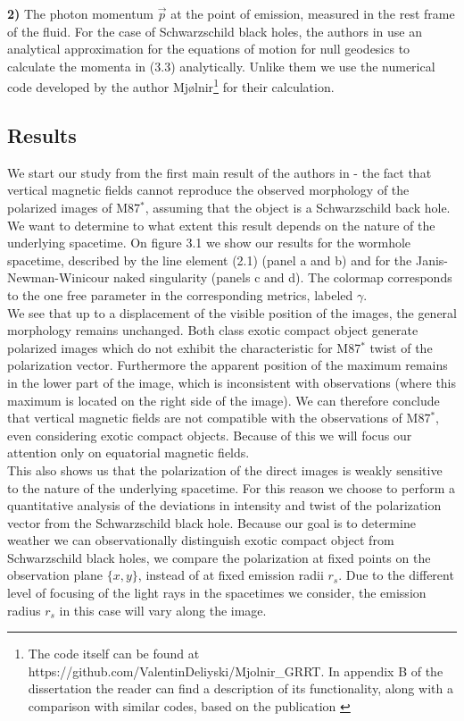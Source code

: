 \documentclass[12pt]{article}
\numberwithin{equation}{section}
\numberwithin{figure}{section}
\begin{document}
	\textbf{2)} The photon momentum $\vec{p}$ at the point of emission, measured in the rest frame of the fluid. For the case of Schwarzschild black holes, the authors in \cite{Narayan2021} use an analytical approximation for the equations of motion for null geodesics to calculate the momenta in (3.3) analytically. Unlike them we use the numerical code developed by the author Mjølnir\footnote{The code itself can be found at https://github.com/ValentinDeliyski/Mjolnir\_GRRT. In appendix B of the dissertation the reader can find a description of its functionality, along with a comparison with similar codes, based on the publication \cite{Gold2020}} for their calculation.
	\newpage
	\subsection{Results}
	
	We start our study from the first main result of the authors in \cite{Narayan2021} - the fact that vertical magnetic fields cannot reproduce the observed morphology of the polarized images of M87$^*$, assuming that the object is a Schwarzschild back hole. We want to determine to what extent this result depends on the nature of the underlying spacetime. On figure 3.1 we show our results for the wormhole spacetime, described by the line element (2.1) (panel a and b) and for the Janis-Newman-Winicour naked singularity (panels c and d). The colormap corresponds to the one free parameter in the corresponding metrics, labeled $\gamma$.\\
	
	We see that up to a displacement of the visible position of the images, the general morphology remains unchanged. Both class exotic compact object generate polarized images which do not exhibit the characteristic for M87$^*$ twist of the polarization vector. Furthermore the apparent position of the maximum remains in the lower part of the image, which is inconsistent with observations (where this maximum is located on the right side of the image). We can therefore conclude that vertical magnetic fields are not compatible with the observations of M87$^*$, even considering exotic compact objects. Because of this we will focus our attention only on equatorial magnetic fields.\\

	This also shows us that the polarization of the direct images is weakly sensitive to the nature of the underlying spacetime. For this reason we choose to perform a quantitative analysis of the deviations in intensity and twist of the polarization vector from the Schwarzschild black hole. Because our goal is to determine weather we can observationally distinguish exotic compact object from Schwarzschild black holes, we compare the polarization at fixed points on the observation plane $\{x,y\}$, instead of at fixed emission radii $r_s$. Due to the different level of focusing of the light rays in the spacetimes we consider, the emission radius $r_s$ in this case will vary along the image.\\
	
\end{document}
